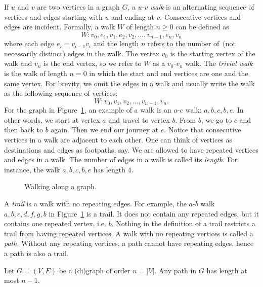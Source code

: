 If $u$ and $v$ are two vertices in a graph $G$, a $u$-$v$ \emph{walk}
is an alternating sequence of vertices and edges starting with $u$ and
ending at $v$. Consecutive vertices and edges are incident. Formally,
a walk $W$ of length $n \geq 0$ can be defined as
\[
W: v_0, e_1, v_1, e_2, v_2, \dots, v_{n-1}, e_n, v_n
\]
where each edge $e_i = v_{i-1} v_i$ and the length $n$ refers to the
number of~(not necessarily distinct) edges in the walk. The vertex
$v_0$ is the starting vertex of the walk and $v_n$ is the end vertex,
so we refer to $W$ as a $v_0$-$v_n$ walk. The \emph{trivial walk} is
the walk of length $n = 0$ in which the start and end vertices are one
and the same vertex. For brevity, we omit the edges in a walk and
usually write the walk as the following sequence of vertices:
\[
W: v_0, v_1, v_2, \dots, v_{n-1}, v_n.
\]
For the graph in Figure~\ref{fig:introduction:types_of_walks}, an
example of a walk is an $a$-$e$ walk: $a, b, c, b, e$. In other words,
we start at vertex $a$ and travel to vertex $b$. From $b$, we go to
$c$ and then back to $b$ again. Then we end our journey at $e$. Notice
that consecutive vertices in a walk are adjacent to each other. One
can think of vertices as destinations and edges as footpaths, say. We
are allowed to have repeated vertices and edges in a walk. The number
of edges in a walk is called its \emph{length}. For instance, the
walk $a, b, c, b, e$ has length $4$.

\begin{figure}[!htbp]
\centering

\caption{Walking along a graph.}
\label{fig:introduction:types_of_walks}
\end{figure}

A \emph{trail} is a walk with no repeating edges. For example, the
$a$-$b$ walk $a, b, c, d, f, g, b$ in
Figure~\ref{fig:introduction:types_of_walks} is a trail. It does not
contain any repeated edges, but it contains one repeated vertex,
i.e. $b$. Nothing in the definition of a trail restricts a trail from
having repeated vertices.
A walk with no repeating vertices is called a \emph{path}. Without any
repeating vertices, a path cannot have repeating edges, hence a path
is also a trail.

\begin{corollary}
\label{cor:introduction:any_path_has_length_at_most_n_minus_1}
Let $G = (V, E)$ be a (di)graph of order $n = |V|$. Any path in $G$
has length at most $n - 1$.
\end{corollary}

